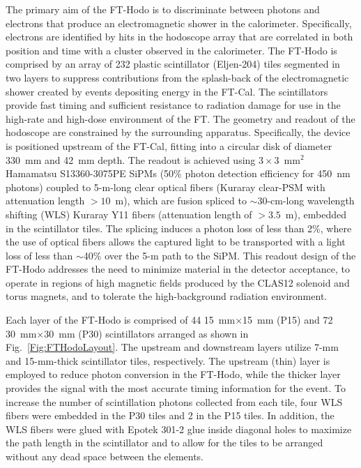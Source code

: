 The primary aim of the FT-Hodo is to discriminate between photons and electrons that produce an electromagnetic
shower in the calorimeter. Specifically, electrons are identified by hits in the hodoscope array that are correlated
in both position and time with a cluster observed in the calorimeter. The FT-Hodo is comprised by an array of 232
plastic scintillator (Eljen-204) tiles segmented in two layers to suppress contributions from the splash-back of the
electromagnetic shower created by events depositing energy in the FT-Cal. The scintillators provide fast timing and
sufficient resistance to radiation damage for use in the high-rate and high-dose environment of the FT. The geometry
and readout of the hodoscope are constrained by the surrounding apparatus. Specifically, the device is positioned
upstream of the FT-Cal, fitting into a circular disk of diameter 330~mm and 42~mm depth. The readout is achieved
using $3 \times 3$~mm$^2$ Hamamatsu S13360-3075PE SiPMs (50\% photon detection efficiency for 450~nm
photons) coupled to 5-m-long clear optical fibers (Kuraray clear-PSM with attenuation length $>10$~m), which are
fusion spliced to $\sim$30-cm-long wavelength shifting (WLS) Kuraray Y11 fibers (attenuation length of $> 3.5$~m),
embedded in the scintillator tiles. The splicing induces a photon loss of less than 2\%, where the use of optical fibers
allows the captured light to be transported with a light loss of less than $\sim$40\% over the 5-m path to the SiPM.
This readout design of the FT-Hodo addresses the need to minimize material in the detector acceptance, to operate
in regions of high magnetic fields produced by the CLAS12 solenoid and torus magnets, and to tolerate the
high-background radiation environment. 

Each layer of the FT-Hodo is comprised of 44 15~mm$\times$15~mm (P15) and 72 30~mm$\times$30~mm (P30)
scintillators arranged as shown in Fig.~\ref{Fig:FTHodoLayout}. The upstream and downstream layers utilize 7-mm
and 15-mm-thick scintillator tiles, respectively. The upstream (thin) layer is employed to reduce photon conversion in
the FT-Hodo, while the thicker layer provides the signal with the most accurate timing information for the event. To
increase the number of scintillation photons collected from each tile, four WLS fibers were embedded in the P30
tiles and 2 in the P15 tiles. In addition, the WLS fibers were glued with Epotek 301-2 glue inside diagonal holes to
maximize the path length in the scintillator and to allow for the tiles to be arranged without any dead space between
the elements.

